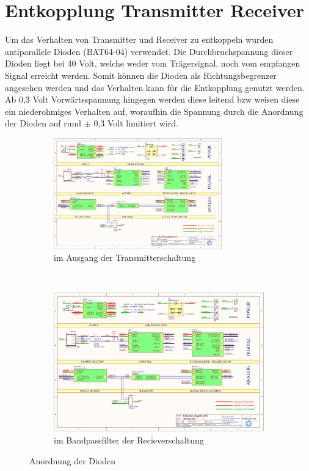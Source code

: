 \section{Entkopplung Transmitter Receiver}
Um das Verhalten von Transmitter und Receiver zu entkoppeln wurden antiparallele Dioden (BAT64-04) verwendet. Die Durchbruchspannung dieser Dioden liegt bei 40 Volt, welche weder vom Trägersignal, noch vom empfangen Signal erreicht werden. Somit können die Dioden als Richtungsbegrenzer angesehen werden und das Verhalten kann für die Entkopplung genutzt werden. Ab 0,3 Volt Vorwärtsspannung hingegen werden diese leitend \ac{bzw} weisen diese ein niederohmiges Verhalten auf, woraufhin die Spannung durch die Anordnung der Dioden auf rund $\pm$ 0,3 Volt limitiert wird.\cite{bat64}
\begin{figure}[h!]
        \centering
        \begin{subfigure}[b]{0.48\textwidth}
        \centering
                \includegraphics[page=5, width=0.8\textwidth, trim =242mm 80mm 10mm 87mm, clip=true]{images/pcb/USD2015_0101.pdf}
	    		\caption{im Ausgang der Transmitterschaltung}
	    		\label{fig:dioden_tx}
        \end{subfigure}%
        \hfil
        ~ %
        \begin{subfigure}[b]{0.48\textwidth}
                \includegraphics[page=3, width=\textwidth, trim=50mm 91mm 150mm 59mm, clip=true]{images/pcb/new.pdf}
		    \caption{im Bandpassfilter der Recieverschaltung}
		    \label{fig:dioden_rx}
        \end{subfigure}
        \caption{Anordnung der Dioden}\label{fig:filter_final}
\end{figure}
